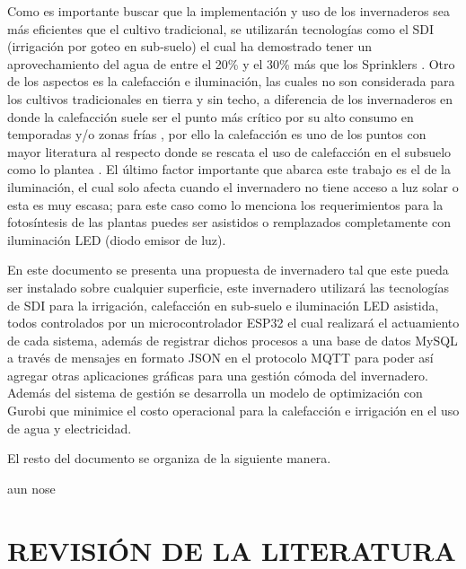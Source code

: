 \documentclass[letterpaper,conference]{IEEEtran}
\begin{document}
Como es importante buscar que la implementación y uso de los invernaderos sea más eficientes que el cultivo tradicional, se utilizarán tecnologías como el SDI (irrigación por goteo en sub-suelo) el cual ha demostrado tener un aprovechamiento del agua de entre el 20\% y el 30\% más que los Sprinklers \parencite{Zaccaria2017}. Otro de los aspectos es la calefacción e iluminación, las cuales no son considerada para los cultivos tradicionales en tierra y sin techo, a diferencia de los invernaderos en donde la calefacción suele ser el punto más crítico por su alto consumo en temporadas y/o zonas frías \cite{Dong2018}, por ello la calefacción es uno de los puntos con mayor literatura al respecto donde se rescata el uso de calefacción en el subsuelo como lo plantea \parencite{Kurpaska2000}. El último factor importante que abarca este trabajo es el de la iluminación, el cual solo afecta cuando el invernadero no tiene acceso a luz solar o esta es muy escasa; para este caso como lo menciona \parencite{VanIersel2017} los requerimientos para la fotosíntesis de las plantas puedes ser asistidos o remplazados completamente con iluminación LED (diodo emisor de luz).

En este documento se presenta una propuesta de invernadero tal que este pueda ser instalado sobre cualquier superficie, este invernadero utilizará las tecnologías de SDI para la irrigación, calefacción en sub-suelo e iluminación LED asistida, todos controlados por un microcontrolador ESP32 el cual realizará el actuamiento de cada sistema, además de registrar dichos procesos a una base de datos MySQL a través de mensajes en formato JSON en el protocolo MQTT para poder así agregar otras aplicaciones gráficas para una gestión cómoda del invernadero. Además del sistema de gestión se desarrolla un modelo de optimización con Gurobi que minimice el costo operacional para la calefacción e irrigación en el uso de agua y electricidad.

El resto del documento se organiza de la siguiente manera.

aun nose








\section{REVISIÓN DE LA LITERATURA}

\end{document}

